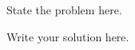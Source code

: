 \documentclass[10pt,letterpaper,cm]{nupset}
\begin{document}
\begin{problem}
State the problem here.
\end{problem}
\begin{solution}
Write your solution here.
\end{solution}
\end{document}

